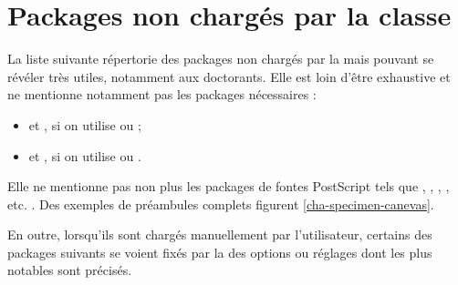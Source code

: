 \section{Packages non chargés par la classe}\label{sec-packages-non-charges}

La liste suivante répertorie des packages non chargés par la \yatCl{} mais
pouvant se révéler très utiles, notamment aux doctorants.  Elle est loin d'être
exhaustive et ne mentionne notamment pas les packages nécessaires :
\begin{itemize}
\item {} et , si on utilise
   ou
   ;
\item {} et , si on utilise
   ou
  .
\end{itemize}
Elle ne mentionne pas non plus les packages de
fontes PostScript tels que
, , , ,
etc. . Des exemples de préambules complets figurent
\vref{cha-specimen-canevas}.

En outre, lorsqu'ils sont chargés manuellement par l'utilisateur, certains des
packages suivants se voient fixés par la \yatCl{} des options ou réglages dont
les plus notables sont précisés.

